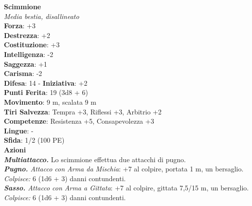 \begin{multicols}{2}
\medskip\textbf{Scimmione}\\
\emph{Media bestia, disallineato}\\
\textbf{Forza}: +3\\
\textbf{Destrezza}: +2\\
\textbf{Costituzione}: +3\\
\textbf{Intelligenza}: -2\\
\textbf{Saggezza}: +1\\
\textbf{Carisma}: -2\\
\textbf{Difesa}: 14 - \textbf{Iniziativa}: +2\\
\textbf{Punti Ferita}: 19 (3d8 + 6)\\
\textbf{Movimento}: 9 m, scalata 9 m\\
\textbf{Tiri Salvezza}: Tempra +3, Riflessi +3, Arbitrio +2\\
\textbf{Competenze}: Resistenza +5, Consapevolezza +3\\
\textbf{Lingue}: -\\
\textbf{Sfida}: 1/2 (100 PE)\smallskip\\
\smallskip\textbf{Azioni}\\
\emph{\textbf{Multiattacco.}} Lo scimmione effettua due attacchi di pugno.\\
\emph{\textbf{Pugno.} Attacco con Arma da Mischia}: +7 al colpire, portata 1 m, un bersaglio.\\
\emph{Colpisce:} 6 (1d6 + 3) danni contundenti.\\
\emph{\textbf{Sasso.} Attacco con Arma a Gittata}: +7 al colpire, gittata 7,5/15 m, un bersaglio.\\
\emph{Colpisce:} 6 (1d6 + 3) danni contundenti.\\


\end{multicols}
